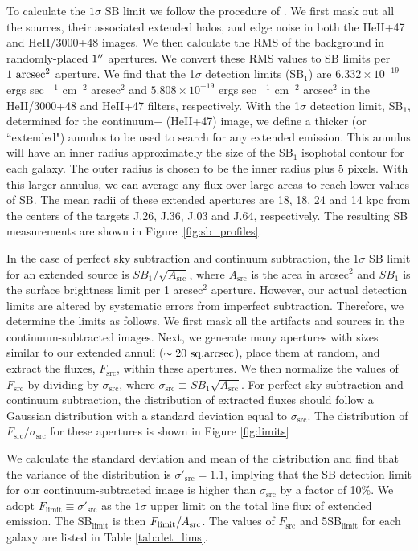 \documentclass[trackchanges,twocolumn]{aastex62}
\begin{document}
To calculate the $1\sigma$ SB limit we follow the procedure of \cite{Battaia_2015}. We first mask out all the sources, their associated extended halos, and edge noise in both the HeII+47 and HeII/3000+48 images. We then calculate the RMS of the background in randomly-placed $1\mbox{$^{\prime\prime}$}$ apertures. We convert these RMS values to SB limits per $1~\rm arcsec^2$  aperture. We find that the 1$\sigma$ detection limits (SB$_1$) are $6.332\times10^{-19}$ ergs sec $^{-1}$ cm$^{-2}$ arcsec$^2$ and $5.808\times10^{-19} $ ergs sec $^{-1}$ cm$^{-2}$ arcsec$^2$ in the HeII/3000+48 and HeII+47 filters, respectively. 
With the 1$\sigma$ detection limit, SB$_1$, determined for the continuum+ (HeII+47) image, we define a thicker (or ``extended") annulus to be used to search for any extended  emission. This annulus will have an inner radius approximately the size of the SB$_1$ isophotal contour for each galaxy. The outer radius is chosen to be the inner radius plus 5 pixels. With this larger annulus, we can average any flux over large areas to reach lower values of SB. The mean radii of these extended apertures are 18, 18, 24 and 14 kpc from the centers of the targets J.26, J.36, J.03 and J.64, respectively. The resulting SB measurements are shown in Figure~\ref{fig:sb_profiles}.

In the case of perfect sky subtraction and continuum subtraction, the 1$\sigma$ SB limit for an extended source is $SB_{1}/\sqrt{A_\text{src}}$, where $A_\text{src}$ is the area in arcsec$^2$ and $SB_{1}$ is the surface brightness limit per 1 arcsec$^2$ aperture. However, our actual detection limits are altered by systematic errors from imperfect subtraction. Therefore, we determine the limits as follows. 
We first mask all the artifacts and sources in the continuum-subtracted images. Next, we generate many apertures with sizes similar to our extended annuli ($\sim 20 \rm\ sq.arcsec$), place them at random, and extract the fluxes, $F_{\text{src}}$, within these apertures. We then normalize the values of $F_{\text{src}}$ by dividing by $\sigma_{\text{src}}$, where $\sigma_{\text{src}} \equiv SB_{1}\sqrt{A_\text{src}}$. For perfect sky subtraction and continuum subtraction, the distribution of extracted fluxes should follow a Gaussian distribution with a standard deviation equal to $\sigma_{\text{src}}$. The distribution of $F_{\text{src}}/\sigma_{\text{src}}$ for these apertures is shown in Figure \ref{fig:limits}

We calculate the standard deviation and mean of the distribution and find that the variance of the distribution is $\sigma'_{\text{src}}=1.1$, implying that the SB detection limit for our continuum-subtracted image is higher than $\sigma_{\text{src}}$ by a factor of 10\%. We adopt $F_{\text{limit}} \equiv \sigma'_{\text{src}}$  as the $1 \sigma$ upper limit on the total line flux of extended  emission. The SB$_{\text{limit}}$ is then $F_{\text{limit}}/A_{\rm{src}}$. The values of $F_{\text{src}}$ and 5SB$_{\text{limit}}$ for each galaxy are listed in Table \ref{tab:det_lims}.
\end{document}
